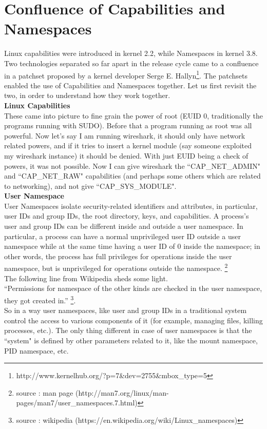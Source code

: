 \documentclass[twoside]{iitbreport}
\begin{document}
\section{Confluence of Capabilities and Namespaces}
Linux capabilities were introduced in kernel 2.2, while Namespaces in kernel 3.8. Two technologies separated so far apart in the release cycle came to a confluence in a patchset proposed by a kernel developer Serge E. Hallyn\footnote{http://www.kernelhub.org/?p=7\&dev=2755\&mbox\_type=5}. The patchsets enabled the use of Capabilities and Namespaces together. Let us first revisit the two, in order to understand how they work together.
\\
\textbf{Linux Capabilities}\\
These came into picture to fine grain the power of root (EUID 0, traditionally the programs running with SUDO). Before that a program running as root was all powerful. Now let's say I am running wireshark, it should only have network related powers, and if it tries to insert a kernel module (say someone exploited my wireshark instance) it should be denied. With just EUID being a check of powers, it was not possible. Now I can give wireshark the ``CAP\_NET\_ADMIN" and ``CAP\_NET\_RAW" capabilities (and perhaps some others which are related to networking), and not give ``CAP\_SYS\_MODULE".\\

\textbf{User Namespace}\\
User Namespaces isolate security-related identifiers and attributes, in particular, user IDs and group IDs, the root directory, keys, and capabilities. A process's user and group IDs can be different inside and outside a user namespace. In particular, a process can have a normal unprivileged user ID outside a user namespace while at the same time having a user ID of 0 inside the namespace; in other words, the process has full privileges for operations inside the user namespace, but is unprivileged for operations outside the namespace. \footnote{source : man page (http://man7.org/linux/man-pages/man7/user\_namespaces.7.html)}\\
The following line from Wikipedia sheds some light.\\
``Permissions for namespace of the other kinds are checked in the user namespace, they got created in.'' \footnote{source : wikipedia (https://en.wikipedia.org/wiki/Linux\_namespaces)}.\\

So in a way user namespaces, like user and group IDs in a traditional system control the access to various components of it (for example, managing files, killing processes, etc.). The only thing different in case of user namespaces is that the ``system" is defined by other parameters related to it, like the mount namespace, PID namespace, etc.
\end{document}
